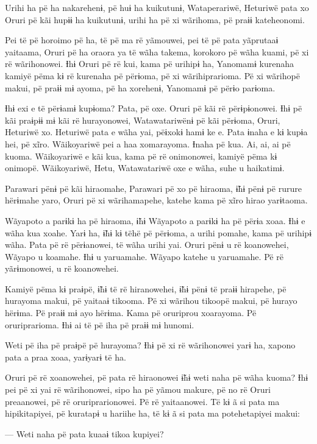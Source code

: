 Urihi ha pë ha nakarehenɨ, pë huɨ ha kuikutunɨ, Wataperariwë, Heturiwë
pata xo Oruri pë kãi hupɨɨ ha kuikutunɨ, urihi ha pë xi wãrihoma, pë
praɨɨ kateheonomi. 

Pei të pë horoimo pë ha, të pë ma rë yãmouwei, pei të pë pata yãprutaaɨ
 yaitaama, Oruri pë ha oraora ya të wãha takema, korokoro pë wãha kuami,
 pë xi rë wãrihonowei. Ɨhɨ Oruri pë rë kui, kama pë urihipɨ ha, Yanomamɨ
 kurenaha kamiyë pëma kɨ rë kurenaha pë përɨoma, pë xi wãrihiprarioma. Pë
 xi wãrihopë makui, pë praɨɨ mɨ ayoma, pë ha xorehenɨ, Yanomamɨ pë përɨo
 parɨoma. 

Ɨhɨ exi e të përɨamɨ kupɨoma? Pata, pë oxe. Oruri pë kãi rë
 përɨpɨonowei. Ɨhɨ pë kãi praɨpɨɨ mɨ kãi rë hurayonowei, Watawatariwënɨ
 pë kãi përɨoma, Oruri, Heturiwë xo. Heturiwë pata e wãha yai, pëɨxokɨ
 hamɨ ke e. Pata ɨnaha e kɨ kupɨa hei, pë xĩro. Wãikoyariwë pei a haa
 xomarayoma. Ɨnaha pë kua. Ai, ai, ai pë kuoma. Wãikoyariwë e kãi kua,
 kama pë rë onimonowei, kamiyë pëma kɨ onimopë. Wãikoyariwë, Hetu,
 Watawatariwë oxe e wãha, suhe u haikatimɨ. 

Parawari pënɨ pë kãi hiraomahe, Parawari pë xo pë hiraoma, ɨ̃hɨ pënɨ pë
rurure hërɨmahe yaro, Oruri pë xi wãrihamapehe, katehe kama pë xĩro
hirao yarɨtaoma. 

Wãyapoto a parɨkɨ ha pë hiraoma, ɨ̃hɨ Wãyapoto a parɨkɨ ha pë përɨa xoaa.
Ɨhɨ e wãha kua xoahe. Yarɨ ha, ɨ̃hɨ kɨ tëhë pë përɨoma, a urihi pomahe,
kama pë urihipɨ wãha. Pata pë rë përɨanowei, të wãha urihi yai. Oruri
pënɨ u rë koanowehei, Wãyapo u koamahe. Ɨhɨ u yaruamahe. Wãyapo katehe u
yaruamahe. Pë rë yãrɨmonowei, u rë koanowehei. 

Kamiyë pëma kɨ praɨpë, ɨ̃hɨ të rë hiranowehei, ɨ̃hɨ pënɨ të praɨɨ
hirapehe, pë hurayoma makui, pë yaitaaɨ tikooma. Pë xi wãrihou tikoopë
makui, pë hurayo hërɨma. Pë praɨɨ mɨ ayo hërɨma. Kama pë oruriprou
xoarayoma. Pë oruriprarioma. Ɨhɨ ai të pë iha pë praɨɨ mɨ hunomi. 

Weti pë iha pë praɨpë pë hurayoma? Ɨhɨ pë xi rë wãrihonowei yarɨ ha,
xapono pata a praa xoaa, yarɨyarɨ të ha. 

Oruri pë rë xoanowehei, pë pata rë hiraonowei ɨ̃hɨ weti naha pë wãha
kuoma? Ɨhɨ pei pë xi yai rë wãrihonowei, sipo ha pë yãmou makure, pë no
rë Oruri preaanowei, pë rë oruriprarionowei. Pë rë yaitaanowei. Të kɨ ã
si pata ma hipikitapiyei, pë kuratapɨ u hariihe ha, të kɨ ã si pata ma
potehetapiyei makui: 

--- Weti naha pë pata kuaaɨ tikoa kupiyei?

